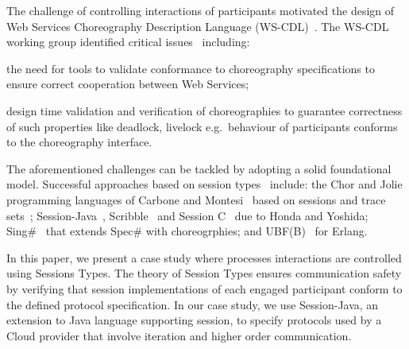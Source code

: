\documentclass[10pt]{llncs}
\begin{document}

The challenge of controlling interactions of participants motivated the design of Web Services Choreography Description Language (WS-CDL)~\cite{session-types-sessions}.
The WS-CDL working group identified critical issues~\cite{ws-critical-overview} including:
\begin{compactenum}
	\item the need for tools to validate conformance to choreography specifications to ensure correct cooperation between Web Services;
	\item design time validation and verification of choreographies to guarantee correctness of such properties like deadlock, livelock e.g.\ behaviour of participants conforms to the choreography interface.
\end{compactenum}

The aforementioned challenges can be tackled by adopting a solid foundational model. Successful approaches based on session types~\cite{session-types-sessions,carbone2007structured} include: the Chor and Jolie programming languages of Carbone and Montesi~\cite{chor-lang,carbone2013deadlock} based on sessions and trace sets~\cite{chor-essence}; Session-Java~\cite{sj-lang}, Scribble~\cite{honda2011scribbling} and Session C~\cite{ng2012multiparty} due to Honda and Yoshida; Sing\#~\cite{basu2012deciding} that extends Spec\# with choreogrphies; and UBF(B)~\cite{armstrong2002getting} for Erlang.

In this paper, we present a case study where processes interactions are controlled using Sessions Types. The theory of Session Types ensures communication safety by verifying that session implementations of each engaged participant conform to the defined protocol specification. In our case study, we use Session-Java, an extension to Java language supporting session, to specify protocols used by a Cloud provider that involve iteration and higher order communication.
\end{document}
